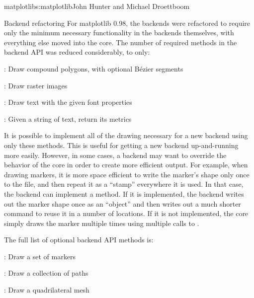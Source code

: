 \begin{aosachapter}{matplotlib}{s:matplotlib}{John Hunter and Michael Droettboom}
\begin{aosasect1}{Backend refactoring}
For matplotlib 0.98, the backends were refactored to require only the
minimum necessary functionality in the backends themselves, with
everything else moved into the core.  The number of required methods
in the backend API was reduced considerably, to only:

\begin{aosaitemize}

  \item {}: Draw compound polygons, with optional
    B\'ezier segments

  \item {}: Draw raster images

  \item {}: Draw text with the given font properties

  \item {}: Given a string of
    text, return its metrics

\end{aosaitemize}

It is possible to implement all of the drawing necessary for a new
backend using only these methods.  This is useful for getting a new
backend up-and-running more easily.  However, in some cases, a backend
may want to override the behavior of the core in order to create more
efficient output.  For example, when drawing markers, it is more space
efficient to write the marker's shape only once to the file, and then
repeat it as a ``stamp'' everywhere it is used.  In that case, the
backend can implement a  method.  If it is
implemented, the backend writes out the marker shape once as an
``object'' and then writes out a much shorter command to reuse it in
a number of locations.  If it is not implemented, the core simply
draws the marker multiple times using multiple calls to
.

The full list of optional backend API methods is:

\begin{aosaitemize}

  \item {}: Draw a set of markers

  \item {}: Draw a collection of paths

  \item {}: Draw a quadrilateral mesh

\end{aosaitemize}


\end{aosasect1}
\end{aosachapter}
